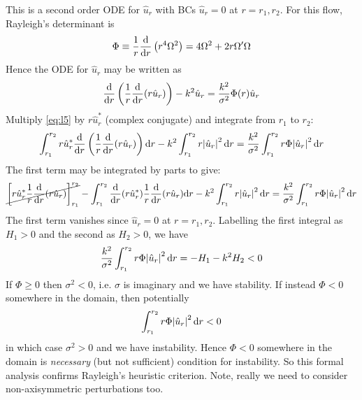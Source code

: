 \documentclass{jknotes}
\begin{document}
This is a second order ODE for $\hat{u}_r$ with BCs $\hat{u}_r = 0$ at $r=
r_1, r_2$. For this flow, Rayleigh's determinant is
\begin{equation}
	\Phi \equiv \frac{1}{r}
	\frac{\diffd}{\diffd r}\left( r^4 \Omega^2 \right) = 4\Omega^2 + 2r\Omega'
	\Omega
\end{equation}
Hence the ODE for $\hat{u}_r$ may be written as
\begin{equation}
	\frac{\diffd}{\diffd r}\left(\frac{1}{r}\frac{\diffd}{\diffd
	r}(r\hat{u}_r)\right) - k^2 \hat{u}_r = \frac{k^2}{\sigma^2} \Phi(r)
	\hat{u}_r
	\label{eq:l5}
\end{equation}
Multiply \eqref{eq:l5} by $r\hat{u}_r^*$ (complex conjugate) and integrate
from $r_1$ to $r_2$:
\begin{equation}
	\int_{r_1}^{r_2} r \hat{u}_r^* \frac{\diffd}{\diffd r} \left(
	\frac{1}{r}\frac{\diffd}{\diffd r}(r\hat{u}_r)\right) \diffd r - k^2
	\int_{r_1}^{r_2} r \abs{\hat{u}_r}^2 \, \diffd r = \frac{k^2}{\sigma^2}
	\int_{r_1}^{r_2} r \Phi \abs{\hat{u}_r}^2 \, \diffd r
\end{equation}
The first term may be integrated by parts to give:
\begin{equation}
	\cancel{\left[ r\hat{u}_r^* \frac{1}{r} \frac{\diffd}{\diffd
	r}(r\hat{u}_r)\right]_{r_1}^{r_2}}
	-\int_{r_1}^{r_2} \frac{\diffd}{\diffd r}(r \hat{u}_r^*)\frac{1}{r} \frac{\diffd}{\diffd r} (r\hat{u}_r) \diffd r - k^2
	\int_{r_1}^{r_2} r \abs{\hat{u}_r}^2 \, \diffd r = \frac{k^2}{\sigma^2}
	\int_{r_1}^{r_2} r \Phi \abs{\hat{u}_r}^2 \, \diffd r
\end{equation}
The first term vanishes since $\hat{u}_r =0$ at $r=r_1,r_2$. Labelling the
first integral as $H_1 > 0$ and the second as $H_2 > 0$, we have
\begin{equation}
	\frac{k^2}{\sigma^2}
	\int_{r_1}^{r_2} r \Phi \abs{\hat{u}_r}^2 \, \diffd r = -H_1 - k^2 H_2 < 0
\end{equation}
If $\Phi \ge 0$ then $\sigma^2 < 0$, i.e. $\sigma$ is imaginary and we have
stability. If instead $\Phi < 0$ somewhere in the domain, then potentially
\begin{equation}
	\int_{r_1}^{r_2} r \Phi \abs{\hat{u}_r}^2 \, \diffd r < 0
\end{equation}
in which case $\sigma^2 > 0$ and we have instability. Hence $\Phi < 0$
somewhere in the domain is \emph{necessary} (but not sufficient) condition for
instability. So this formal analysis confirms Rayleigh's heuristic criterion.
Note, really we need to consider non-axisymmetric perturbations too.
\end{document}
